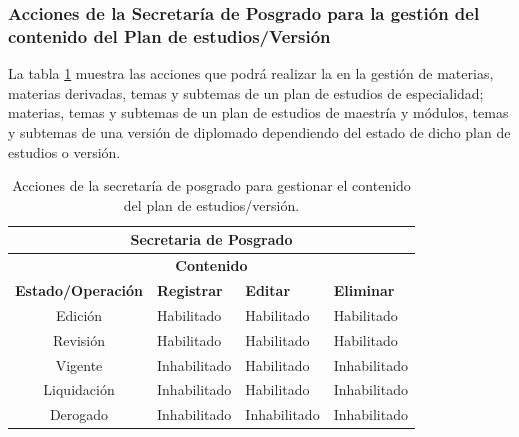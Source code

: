 \subsubsection{Acciones de la Secretaría de Posgrado para la gestión del contenido del Plan de estudios/Versión}
La tabla \ref{tb:habilitarAccionesEditar}  muestra las acciones que podrá realizar la  en la gestión de materias, materias derivadas, temas y subtemas de un plan de estudios de especialidad; materias, temas y subtemas de un plan de estudios de maestría y módulos, temas y subtemas de una versión de diplomado dependiendo del estado de dicho plan de estudios o versión.

\begin{table}[htpb!]
	\centering
	\begin{tabular}{|c|l|l|l|}
		\hline
		\multicolumn{4}{|c|}{\textbf{Secretaria de Posgrado}}\\
		\hline
		\multicolumn{4}{|c|}{\textbf{Contenido}}
		\\ \hline \hline
		\textbf{Estado/Operación} & \textbf{Registrar} & \textbf{Editar} & \textbf{Eliminar} \\ \hline \hline
		Edición & Habilitado & Habilitado & Habilitado \\ \hline
		Revisión & Habilitado & Habilitado & Habilitado \\ \hline
		Vigente & Inhabilitado & Habilitado & Inhabilitado \\ \hline
		Liquidación & Inhabilitado & Habilitado & Inhabilitado \\ \hline
		Derogado & Inhabilitado & Inhabilitado & Inhabilitado \\ \hline
	\end{tabular}
	\caption{Acciones de la secretaría de posgrado para gestionar el contenido del plan de estudios/versión.}
	\hypertarget{tb:habilitarAccionesEditar}{}
	\label{tb:habilitarAccionesEditar}
\end{table}
